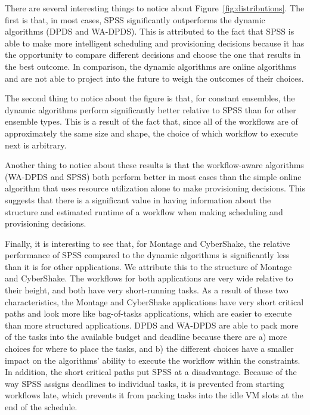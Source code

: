 \documentclass[conference]{IEEEtran}
\begin{document}
There are several interesting things to notice about Figure~\ref{fig:distributions}. The first is that, in most cases, SPSS significantly outperforms the dynamic algorithms (DPDS and WA-DPDS). This is attributed to the fact that SPSS is able to make more intelligent scheduling and provisioning decisions because it has the opportunity to compare different decisions and choose the one that results in the best outcome. In comparison, the dynamic algorithms are online algorithms and are not able to project into the future to weigh the outcomes of their choices.

The second thing to notice about the figure is that, for constant ensembles, the dynamic algorithms perform significantly better relative to SPSS than for other ensemble types. This is a result of the fact that, since all of the workflows are of approximately the same size and shape, the choice of which workflow to execute next is arbitrary.

Another thing to notice about these results is that the workflow-aware algorithms (WA-DPDS and SPSS) both perform better in most cases than the simple online algorithm that uses resource utilization alone to make provisioning decisions. This suggests that there is a significant value in having information about the structure and estimated runtime of a workflow when making scheduling and provisioning decisions.

Finally, it is interesting to see that, for Montage and CyberShake, the relative performance of SPSS compared to the dynamic algorithms is significantly less than it is for other applications. We attribute this to the structure of Montage and CyberShake. The workflows for both applications are very wide relative to their height, and both have very short-running tasks. As a result of these two characteristics, the Montage and CyberShake applications have very short critical paths and look more like bag-of-tasks applications, which are easier to execute than more structured applications. DPDS and WA-DPDS are able to pack more of the tasks into the available budget and deadline because there are a) more choices for where to place the tasks, and b) the different choices have a smaller impact on the algorithms' ability to execute the workflow within the constraints. In addition, the short critical paths put SPSS at a disadvantage. Because of the way SPSS assigns deadlines to individual tasks, it is prevented from starting workflows late, which prevents it from packing tasks into the idle VM slots at the end of the schedule.
\end{document}
